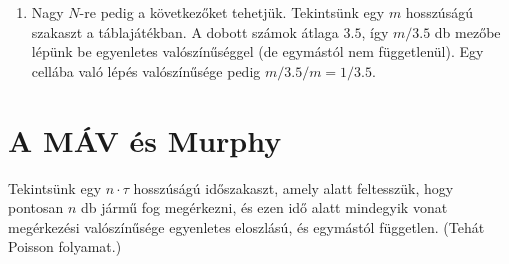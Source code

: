\documentclass[12pt,a4paper]{article}
\begin{document}
\begin{enumerate}
  \item Nagy $N$-re pedig a következőket tehetjük. Tekintsünk egy $m$ hosszúságú szakaszt a táblajátékban. A dobott számok átlaga $3.5$, így $m/3.5$ db mezőbe lépünk be egyenletes valószínűséggel (de egymástól nem függetlenül). Egy cellába való lépés valószínűsége pedig $m/3.5/m = 1/3.5$.
\end{enumerate}
\section{A MÁV és Murphy}
Tekintsünk egy $n \cdot \tau $ hosszúságú időszakaszt, amely alatt feltesszük, hogy pontosan $n$ db jármű fog megérkezni, és ezen idő alatt mindegyik vonat megérkezési valószínűsége egyenletes eloszlású, és egymástól független. (Tehát Poisson folyamat.)
\end{document}
